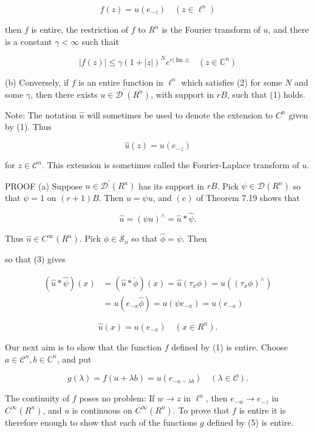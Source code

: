 \documentclass[10pt]{article}
\begin{document}
$$
f(z)=u\left(e_{-z}\right) \quad\left(z \in \ell^{n}\right)
$$

then $f$ is entire, the restriction of $f$ to $R^{n}$ is the Fourier transform of $u$, and there is a constant $\gamma<\infty$ such thait

$$
|f(z)| \leq \gamma(1+|z|)^{N} e^{r|\operatorname{Im} z|} \quad\left(z \in \mathbb{C}^{n}\right)
$$

(b) Conversely, if $f$ is an entire function in $\ell^{n}$ which satisfies (2) for some $N$ and some $\gamma$, then there exists $u \in \mathscr{D}^{\prime}\left(R^{n}\right)$, with support in $r B$, such that (1) holds.

Note: The notation $\hat{u}$ will sometimes be used to denote the extension to $C^{n}$ given by (1). Thus

$$
\hat{u}(z)=u\left(e_{-z}\right)
$$

for $z \in \mathscr{C}^{n}$. This extension is sometimes called the Fourier-Laplace transform of $u$.

PROOF (a) Suppose $u \in \mathscr{D}^{\prime}\left(R^{n}\right)$ has its support in $r B$. Pick $\psi \in \mathscr{D}\left(R^{n}\right)$ so that $\psi=1$ on $(r+1) B$. Then $u=\psi u$, and $(e)$ of Theorem 7.19 shows that

$$
\hat{u}=(\psi u)^{\wedge}=\hat{u} * \hat{\psi} .
$$

Thus $\hat{u} \in C^{\infty}\left(R^{n}\right)$. Pick $\phi \in \mathscr{S}_{n}$ so that $\hat{\phi}=\psi$. Then

so that (3) gives

$$
\begin{aligned}
(\hat{u} * \hat{\psi})(x) & =(\hat{u} * \check{\phi})(x)=\hat{u}\left(\tau_{x} \phi\right)=u\left(\left(\tau_{x} \phi\right)^{\wedge}\right) \\
& =u\left(e_{-x} \hat{\phi}\right)=u\left(\psi e_{-x}\right)=u\left(e_{-x}\right)
\end{aligned}
$$

$$
\hat{u}(x)=u\left(e_{-x}\right) \quad\left(x \in R^{n}\right) .
$$

Our next aim is to show that the function $f$ defined by (1) is entire. Choose $a \in \mathscr{C}^{n}, b \in \mathbb{C}^{n}$, and put

$$
g(\lambda)=f(a+\lambda b)=u\left(e_{-a-\lambda b}\right) \quad(\lambda \in \mathscr{C}) .
$$

The continuity of $f$ poses no problem: If $w \rightarrow z$ in $\ell^{n}$, then $e_{-w} \rightarrow e_{-z}$ in $C^{\infty}\left(R^{n}\right)$, and $u$ is continuous on $C^{\infty}\left(R^{n}\right)$. To prove that $f$ is entire it is therefore enough to show that each of the functions $g$ defined by (5) is entire.
\end{document}
